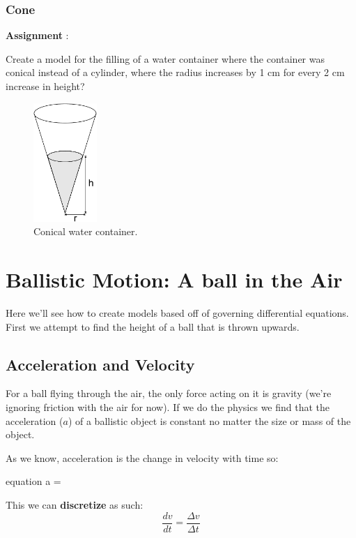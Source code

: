 \documentclass[11pt,fleqn]{book}
\newcommand{\assignment}[1]{
	\begin{tcolorbox}
		\textbf{Assignment \qn}: 
		
		#1
	\end{tcolorbox}
}
\newcounter{qNum}
\newcommand{\qn}{\refstepcounter{qNum} \theqNum}
\begin{document}
	\subsection{Cone}
	\assignment{
	
		Create a model for the filling of a water container where the container was conical instead of a cylinder, where the radius increases by 1 cm for every 2 cm increase in height?
	}
		\begin{figure}[h!]
			\begin{center}
				\includegraphics[height=4.5cm]{cone-rh.pdf}
				\caption{Conical water container.}
			\end{center}
		\end{figure}


\chapter{Ballistic Motion: A ball in the Air}

	Here we'll see how to create models based off of governing differential equations. First we attempt to find the height of a ball that is thrown upwards.
	
  \section{Acceleration and Velocity}
	For a ball flying through the air, the only force acting on it is gravity (we're ignoring friction with the air for now). If we do the physics we find that the acceleration ($a$) of a ballistic object is constant no matter the size or mass of the object.

	As we know, acceleration is the change in velocity with time so:
	\begin{empheq}[box=\fbox]{equation}
		a = 
	\end{empheq}

	This we can \textbf{discretize} as such:
	\begin{equation}
		\frac{dv}{dt} = \frac{\Delta v}{\Delta t}
	\end{equation}
\end{document}
